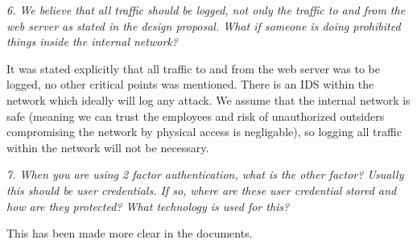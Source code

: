 \textit{6. We believe that all traffic should be logged, not only the traffic to and from the web server as stated in the design proposal. What if someone is doing prohibited things inside the internal network?}

It was stated explicitly that all traffic to and from the web server was to be logged, no other critical points was mentioned. There is an IDS within the network which ideally will log any attack. We assume that the internal network is safe (meaning we can trust the employees and risk of unauthorized outsiders compromising the network by physical access is negligable), so logging all traffic within the network will not be necessary.

\textit{7. When you are using 2 factor authentication, what is the other factor? Usually this should be user credentials. If so, where are these user credential stored and how are they protected? What technology is used for this?}

This has been made more clear in the documents.